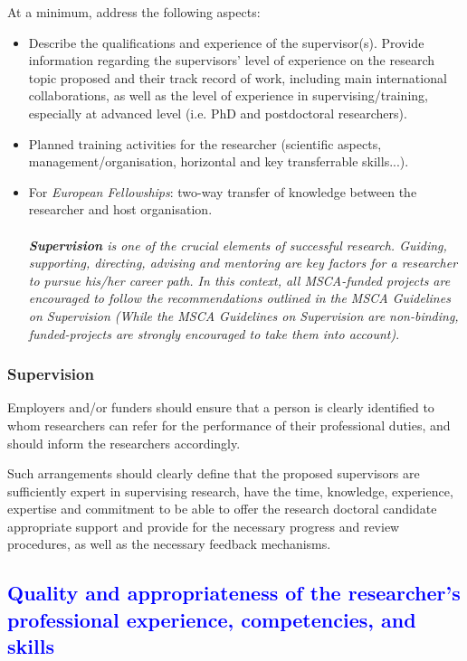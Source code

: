 \documentclass[11pt,a4paper]{article}
\begin{document}
\color{gray}
At a minimum, address the following aspects:
\begin{itemize}
    \item Describe the qualifications and experience of the supervisor(s). Provide information regarding the supervisors' level of experience on the research topic proposed and their track record of work, including main international collaborations, as well as the level of experience in supervising/training, especially at advanced level (i.e. PhD and postdoctoral researchers).
    \item Planned training activities for the researcher (scientific aspects, management/organisation, horizontal and key transferrable skills...).
    \item For \textit{European Fellowships}: two-way transfer of knowledge between the researcher and host organisation.\\
    \\
    \textit{\textbf{Supervision} is one of the crucial elements of successful research. Guiding, supporting, directing, advising and mentoring are key factors for a researcher to pursue his/her career path. In this context, all MSCA-funded projects are encouraged to follow the recommendations outlined in the MSCA Guidelines on Supervision (While the MSCA Guidelines on Supervision are non-binding, funded-projects are strongly encouraged to take them into account)}.
\end{itemize}

\subsubsection{Supervision}
Employers and/or funders should ensure that a person is clearly identified to whom researchers can refer for the performance of their professional duties, and should inform the researchers accordingly. 

Such arrangements should clearly define that the proposed supervisors are sufficiently expert in supervising research, have the time, knowledge, experience, expertise and commitment to be able to offer the research doctoral candidate appropriate support and provide for the necessary progress and review procedures, as well as the necessary feedback mechanisms.
\color{black}


\textcolor{Blue}{\subsection{Quality and appropriateness of the researcher's professional experience, competencies, and skills}}
\end{document}
